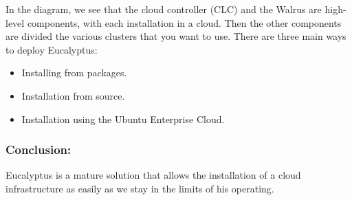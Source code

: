 In the diagram, we see that the cloud controller (CLC) and the Walrus are high-level components, with each installation in a cloud. Then the other components are divided
the various clusters that you want to use.
There are three main ways to deploy Eucalyptus:
\begin{itemize}
 \item Installing from packages.
 \item Installation from source.
 \item Installation using the Ubuntu Enterprise Cloud.
\end{itemize}
\subsubsection{Conclusion: }
Eucalyptus is a mature solution that allows the installation of a cloud infrastructure as easily as we stay in the limits of his operating.
% 
% 
% 
% 
